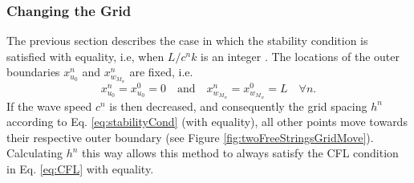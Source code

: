 \subsubsection{Changing the Grid}\label{sec:changingGrid}
The previous section describes the case in which the stability condition is satisfied with equality, i.e, when $L/c^nk$ is an integer%
. The locations of the outer boundaries $x_{u_0}^n$ and $x_{w_{M_w}}^n$ are fixed, i.e.
\begin{equation*}
    x_{u_0}^n = x_{u_0}^0 = 0 \quad \text{and}\quad x_{w_{M_w}}^n = x_{w_{M_w}}^0 = L \quad \forall n.
\end{equation*}
If the wave speed $c^n$ is then decreased, and consequently the grid spacing $h^n$ according to Eq. \eqref{eq:stabilityCond} (with equality), all other points move towards their respective outer boundary (see Figure \ref{fig:twoFreeStringsGridMove}). Calculating $h^n$ this way allows this method to always satisfy the CFL condition in Eq. \eqref{eq:CFL} with equality. %


